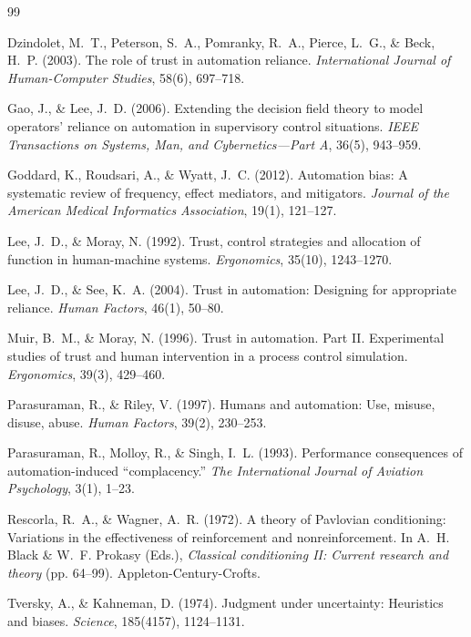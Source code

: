 \documentclass[12pt]{article}
\begin{document}
\begingroup
\renewcommand{\section}[2]{}
\begin{thebibliography}{99}

Dzindolet, M.~T., Peterson, S.~A., Pomranky, R.~A., Pierce, L.~G.,
\& Beck, H.~P. (2003).
The role of trust in automation reliance.
\textit{International Journal of Human-Computer Studies}, 58(6), 697--718.

Gao, J., \& Lee, J.~D. (2006).
Extending the decision field theory to model operators'
reliance on automation in supervisory control situations.
\textit{IEEE Transactions on Systems, Man, and Cybernetics---Part A},
36(5), 943--959.

Goddard, K., Roudsari, A., \& Wyatt, J.~C. (2012).
Automation bias: A systematic review of frequency, effect mediators,
and mitigators.
\textit{Journal of the American Medical Informatics Association},
19(1), 121--127.

Lee, J.~D., \& Moray, N. (1992).
Trust, control strategies and allocation of function in
human-machine systems.
\textit{Ergonomics}, 35(10), 1243--1270.

Lee, J.~D., \& See, K.~A. (2004).
Trust in automation: Designing for appropriate reliance.
\textit{Human Factors}, 46(1), 50--80.

Muir, B.~M., \& Moray, N. (1996).
Trust in automation. Part II. Experimental studies of trust and
human intervention in a process control simulation.
\textit{Ergonomics}, 39(3), 429--460.

Parasuraman, R., \& Riley, V. (1997).
Humans and automation: Use, misuse, disuse, abuse.
\textit{Human Factors}, 39(2), 230--253.

Parasuraman, R., Molloy, R., \& Singh, I.~L. (1993).
Performance consequences of automation-induced ``complacency.''
\textit{The International Journal of Aviation Psychology}, 3(1), 1--23.

Rescorla, R.~A., \& Wagner, A.~R. (1972).
A theory of Pavlovian conditioning: Variations in the effectiveness
of reinforcement and nonreinforcement.
In A.~H. Black \& W.~F. Prokasy (Eds.),
\textit{Classical conditioning II: Current research and theory}
(pp. 64--99). Appleton-Century-Crofts.

Tversky, A., \& Kahneman, D. (1974).
Judgment under uncertainty: Heuristics and biases.
\textit{Science}, 185(4157), 1124--1131.

\end{thebibliography}
\endgroup
\end{document}
